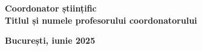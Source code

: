 \begin{titlepage}
    \vspace{0.25cm}
    
    \begin{center}
    \large \textbf{Coordonator științific \\ Titlul și numele profesorului coordonatorului}
    \end{center}
    
    \vspace{2cm}
    
    \begin{center}
    \Large \textbf{București, iunie 2025}
    \end{center}
\end{titlepage}